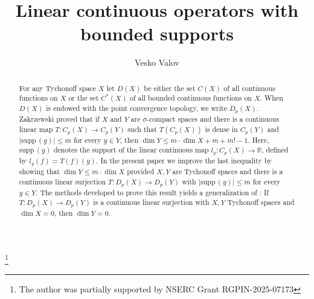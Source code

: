\documentclass[12pt]{amsart}
\def\supp{{\mathrm {supp}}\,}
\begin{document}
\title[Linear continuous operators with bounded supports]
{Linear continuous operators with bounded supports}

\author{Vesko Valov}
\address{Department of Computer Science and Mathematics, Nipissing University,
100 College Drive, P.O. Box 5002, North Bay, ON, P1B 8L7, Canada}
\thanks{The author was partially supported by NSERC Grant RGPIN-2025-07173}




\begin{abstract}
For any Tychonoff space $X$ let $D(X)$ be either the set $C(X)$ of all continuous functions on $X$ or the set $C^*(X)$ of all bounded continuous functions on $X$. When $D(X)$ is endowed with the point convergence topology, we write $D_p(X)$.  Zakrzewski \cite[Theorem 3.12]{kz} proved that if $X$ and $Y$ are $\sigma$-compact spaces and
there is a continuous linear map $T:C_p(X)\to C_p(Y)$ such that $T(C_p(X))$ is dense in $C_p(Y)$ and $|\supp(y)|\leq m$ for every $y\in Y$, then
$\dim Y\leq m\cdot\dim X+m+m!-1$. Here, $\supp(y)$ denotes the support of the linear continuous map $l_y:C_p(X)\to\mathbb R$, defined by 
$l_y(f)=T(f)(y)$. In the present paper we improve the last inequality by showing that $\dim Y\leq m\cdot\dim X$ provided $X,Y$ are Tychonoff spaces and there is a continuous linear surjection $T:D_p(X)\to D_p(Y)$ with $|\supp(y)|\leq m$ for every $y\in Y$. The methods developed to prove this result yields a generalization of \cite[Theorem 1.4]{ev}: If  $T:D_p(X)\to D_p(Y)$ is a continuous linear surjection with $X,Y$ Tychonoff spaces and $\dim X=0$, then $\dim Y=0$. 
\end{abstract}

\maketitle{}


\end{document}
